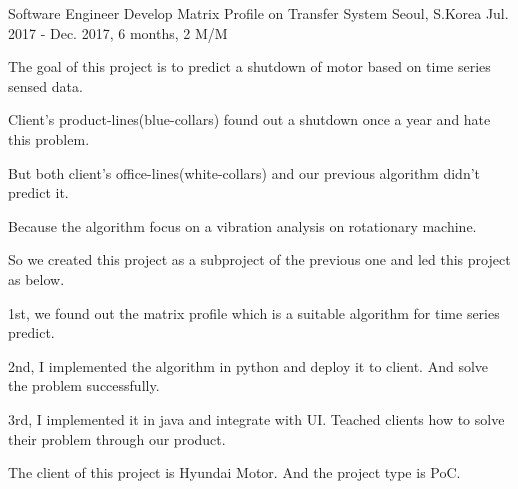 \begin{cventries}
  \cventry
    {Software Engineer} %
    {Develop Matrix Profile on Transfer System} %
    {Seoul, S.Korea} %
    {Jul. 2017 - Dec. 2017, 6 months, 2 M/M} %
    {
      \begin{cvitems} %
        \item {The goal of this project is to predict a shutdown of motor based on time series sensed data.}
        \item {Client's product-lines(blue-collars) found out a shutdown once a year and hate this problem.}
        \item {But both client's office-lines(white-collars) and our previous algorithm didn't predict it.}
        \item {Because the algorithm focus on a vibration analysis on rotationary machine.}
        \item {So we created this project as a subproject of the previous one and led this project as below.}
        \item {1st, we found out the matrix profile which is a suitable algorithm for time series predict.}
        \item {2nd, I implemented the algorithm in python and deploy it to client. And solve the problem successfully.}
        \item {3rd, I implemented it in java and integrate with UI. Teached clients how to solve their problem through our product.}
        \item {The client of this project is Hyundai Motor. And the project type is PoC.}
      \end{cvitems}
    }


\end{cventries}
